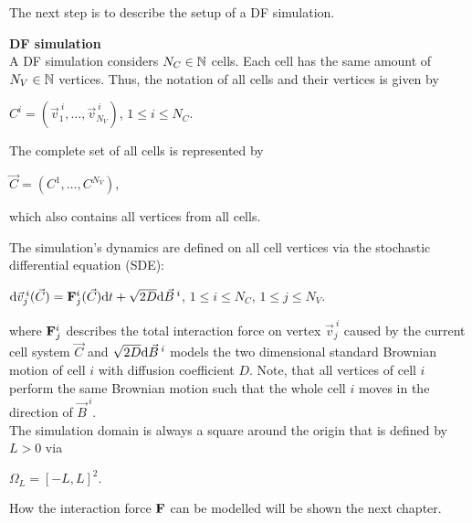 The next step is to describe the setup of a DF simulation. 
\begin{definition} \textbf{DF simulation} \label{def:DF-Sim}  \\
	A DF simulation considers $N_C \in \mathbb{N}$ cells. 
	Each cell has the same amount of $N_V \in \mathbb{N}$ vertices.
	Thus, the notation of all cells and their vertices is given by 
	\begin{center}
		$C^{i} = (\vec{v}^{\:i}_1, \ldots, \vec{v}^{\:i}_{N_V})$, \hspace{0.5em} $1 \leq i \leq N_{C}$. 
	\end{center}

	The complete set of all cells is represented by 
	\begin{center}
		$\vec{C} = (C^{1}, \ldots, C^{N_V})$,
	\end{center}
	which also contains all vertices from all cells.

	The simulation's dynamics are defined on all cell vertices via the stochastic differential equation (SDE):
	\begin{center}
		$ \mathrm{d} \vec{v}^{\:i}_j(\vec{C}) = \mathbf{F}^i_j(\vec{C}) \mathrm{d} t + \sqrt{2 D} \mathrm{d} \vec{B}^{\:i}$, \hspace{0.5em} $1 \leq i \leq N_{C}$, \hspace{0.5em} $1 \leq j \leq N_{V}$. 
	\end{center}
	where $\mathbf{F}^i_j$ describes the total interaction force on vertex $\vec{v}^{\:i}_j$ caused by the current cell system $\vec{C}$ and $\sqrt{2 D} \mathrm{d} \vec{B}^{\:i}$ models the two dimensional standard Brownian motion of cell $i$ with diffusion coefficient $D$.  
	Note, that all vertices of cell $i$ perform the same Brownian motion such that the whole cell $i$ moves in the direction of $\vec{B}^{\:i}$. \\

	The simulation domain is always a square around the origin that is defined by $L > 0$ via 
	\begin{center}
		$
		\Omega_L = [-L, L]^2.
		$
	\end{center} 
\end{definition}

How the interaction force $\mathbf{F}$ can be modelled will be shown the next chapter. 




